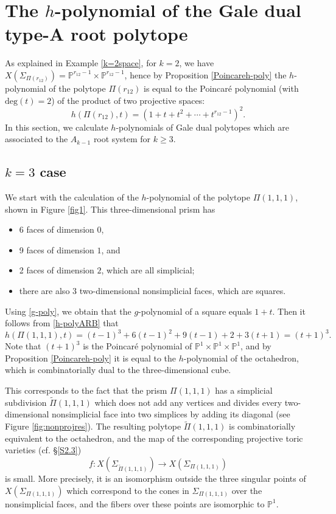 \section{The \texorpdfstring{$h$}{h}-polynomial of the Gale dual type-A root polytope}\label{sec:hpol}
As explained in Example \ref{k=2space}, for $k=2$, we have 
$X(\Sigma_{\Pi(r_{12})}) = \mathbb{P}^{r_{12}-1}\times\mathbb{P}^{r_{12}-1}$, 
hence by Proposition \ref{Poincareh-poly} the $h$-polynomial of the polytope 
$\Pi(r_{12})$ is equal to the Poincar\'e polynomial (with $\mathrm{deg}(t)=2$) 
of the product of two 
projective spaces:
$$h(\Pi(r_{12}), t) = (1+t+t^2+ \cdots +t^{r_{12}-1})^2.$$
In this section, we calculate $h$-polynomials of Gale dual polytopes which are associated to the $A_{k-1}$ root system for $k\geq3$.

\subsection{\texorpdfstring{$k=3$}{k=3} case}
We start with the calculation of the $h$-polynomial of the polytope 
$\Pi(1,1,1)$, shown in Figure \ref{fig1}. This three-dimensional prism 
has\begin{itemize}
	\item  6 faces of dimension $0$, 
	\item 9 faces of dimension $1$, and 
	\item 2 faces of dimension $2$, which are all simplicial;
	\item  there are also 3 two-dimensional nonsimplicial faces, which are 
	squares. 
\end{itemize}
Using  \eqref{g-poly}, we obtain that the $g$-polynomial of a square equals  
$1+t$. 
Then it follows from \eqref{h-polyARB} that
$$h(\Pi(1,1,1), t) = (t-1)^3+6(t-1)^2+9(t-1)+2+3(t+1) = (t+1)^3.$$
Note that $(t+1)^3$ is the Poincar\'e polynomial of 
$\mathbb{P}^1\times\mathbb{P}^1\times\mathbb{P}^1$, and by Proposition 
\ref{Poincareh-poly} it is equal to the $h$-polynomial of the octahedron, 
which is combinatorially dual to the three-dimensional cube. 

This corresponds to the fact that the prism $\Pi(1,1,1)$ has a simplicial 
subdivision $\widetilde{\Pi}(1,1,1)$ which does not add any vertices and 
divides every two-dimensional nonsimplicial face into two simplices by adding 
its diagonal (see Figure \ref{fig:nonprojres}). The resulting polytope 
$\widetilde{\Pi}(1,1,1)$ is combinatorially equivalent to the octahedron, and 
the map of the corresponding projective toric varieties (cf.  \S\ref{S2.3})
$$f: X(\Sigma_{\widetilde{\Pi}(1,1,1)})\to X(\Sigma_{{\Pi}(1,1,1)})$$
is small. More precisely, it is an isomorphism outside the three singular points of $X(\Sigma_{{\Pi}(1,1,1)})$ which correspond to the cones in $\Sigma_{\Pi(1,1,1)}$ over the nonsimplicial faces, and the fibers over these points are isomorphic to $\mathbb{P}^1$.

